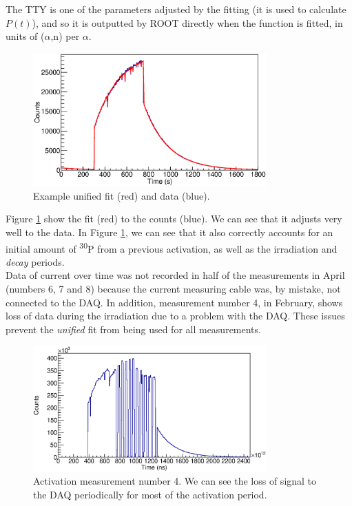 \documentclass[a4paper,12pt]{report}
\newcommand{\an}{($\alpha$,n) }
\newcommand{\Piso}{\textsuperscript{30}P }
\begin{document}
The TTY is one of the parameters adjusted by the fitting (it is used to calculate $P(t)$), and so it is outputted by ROOT directly when the function is fitted, in units of \an per $\alpha$.
\\

\begin{figure}[H]
	\centering
	\includegraphics[width=0.80\textwidth]{example_unified_fit.eps}
	\caption{Example unified fit (red) and data (blue).}
	\label{example_unified_fit}
\end{figure}

Figure \ref{example_unified_fit} show the fit (red) to the counts (blue).
We can see that it adjusts very well to the data.
In Figure \ref{example_unified_fit}, we can see that it also correctly accounts for an initial amount of \Piso from a previous activation, as well as the irradiation and \textit{decay} periods.
\\

Data of current over time was not recorded in half of the measurements in April (numbers 6, 7 and 8) because the current measuring cable was, by mistake, not connected to the DAQ.
In addition, measurement number 4, in February, shows loss of data during the irradiation due to a problem with the DAQ.
These issues prevent the \textit{unified} fit from being used for all measurements.

\begin{figure}[H]
	\centering
	\includegraphics[width=0.80\textwidth]{activation_4_time.eps}
	\caption{Activation measurement number 4.
	We can see the loss of signal to the DAQ periodically for most of the activation period.}
	\label{activation_4_time}
\end{figure}
\end{document}
